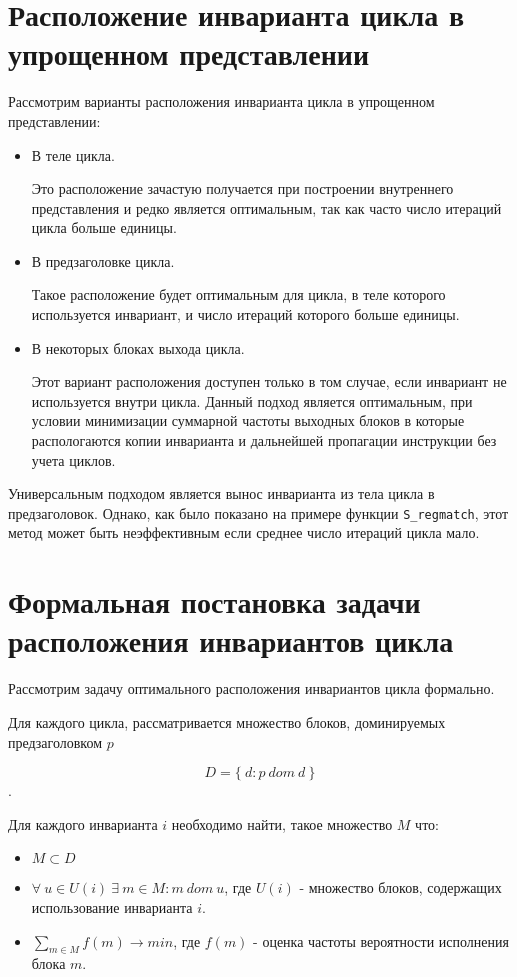 \section{Расположение инварианта цикла в упрощенном представлении}

Рассмотрим варианты расположения инварианта цикла в упрощенном представлении:
\begin{itemize}
    \item В теле цикла.

        Это расположение зачастую получается при построении внутреннего представления и редко является оптимальным, так как часто число итераций цикла больше единицы.

    \item В предзаголовке цикла.

        Такое расположение будет оптимальным для цикла, в теле которого используется инвариант, и число итераций которого больше единицы.

    \item В некоторых блоках выхода цикла.

        Этот вариант расположения доступен только в том случае, если инвариант не используется внутри цикла.
        Данный подход является оптимальным, при условии минимизации суммарной частоты выходных блоков в которые распологаются копии инварианта и дальнейшей пропагации инструкции без учета циклов.
\end{itemize}

Универсальным подходом является вынос инварианта из тела цикла в предзаголовок.
Однако, как было показано на примере функции \texttt{S\_regmatch}, этот метод может быть неэффективным если среднее число итераций цикла мало.

\section{Формальная постановка задачи расположения инвариантов цикла}

Рассмотрим задачу оптимального расположения инвариантов цикла формально.

Для каждого цикла, рассматривается множество блоков, доминируемых предзаголовком $p$

$$D = \{ \: d : p \: dom \: d \: \}$$.

Для каждого инварианта $i$ необходимо найти, такое множество $M$ что:
\begin{itemize}
    \item $M \subset D$
    \item $\forall \: u \in U(i) \: \exists \: m \in M : m \: dom \: u $, где $U(i)$ - множество блоков, содержащих использование инварианта $i$.
    \item $\sum_{m \in M}{f(m)} \to min $, где $f(m)$ - оценка частоты вероятности исполнения блока $m$.
\end{itemize}
\newpage
